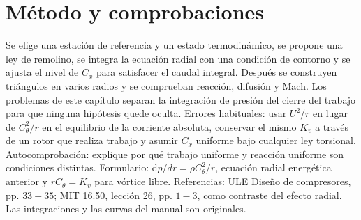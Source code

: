 \documentclass[10pt,openany]{book}
\begin{document}
\section{Método y comprobaciones}

Se elige una estación de referencia y un estado termodinámico, se propone una ley de remolino, se integra la ecuación radial con una condición de contorno y se ajusta el nivel de \(C_x\) para satisfacer el caudal integral. Después se construyen triángulos en varios radios y se comprueban reacción, difusión y Mach. Los problemas de este capítulo separan la integración de presión del cierre del trabajo para que ninguna hipótesis quede oculta.
Errores habituales: usar \(U^2/r\) en lugar de \(C_\theta^2/r\) en el equilibrio de la corriente absoluta, conservar el mismo \(K_v\) a través de un rotor que realiza trabajo y asumir \(C_x\) uniforme bajo cualquier ley torsional. Autocomprobación: explique por qué trabajo uniforme y reacción uniforme son condiciones distintas.
Formulario: \(\mathrm{d}p/dr=\rho C_\theta^2/r\), ecuación radial energética anterior y \(rC_\theta=K_v\) para vórtice libre. Referencias: ULE Diseño de compresores, pp. \(33-35\); MIT 16.50, lección 26, pp. \(1-3\), como contraste del efecto radial. Las integraciones y las curvas del manual son originales.
\end{document}
